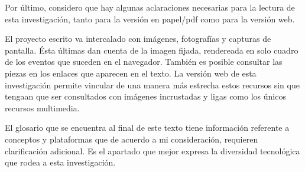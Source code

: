 Por último, considero que hay algunas aclaraciones necesarias para la lectura de esta investigación, tanto para la versión en papel/pdf como para la versión web.

El proyecto escrito va intercalado con imágenes, fotografías y capturas de pantalla. Ésta últimas dan cuenta de la imagen fijada, rendereada en solo cuadro de los eventos que suceden en el navegador. También es posible consultar las piezas en los enlaces que aparecen en el texto. La versión web de esta investigación permite vincular de una manera más estrecha estos recursos sin que tengaan que ser consultados con imágenes incrustadas y ligas como los únicos recursos multimedia. 

El glosario que se encuentra al final de este texto tiene información referente a conceptos y plataformas que de acuerdo a mi consideración, requieren clarificación adicional. Es el apartado que mejor expresa la diversidad tecnológica que rodea a esta investigación. 
